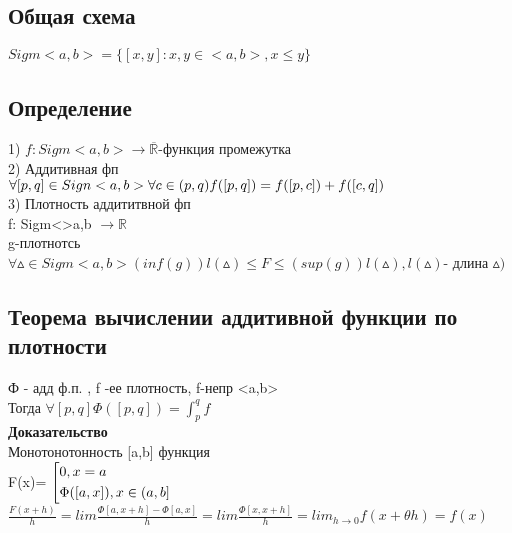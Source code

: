 \documentclass[12pt, a4paper]{article}
\begin{document}
    \subsection{Общая схема}
    
    $Sigm<a,b> = \lbrace[x,y]:x,y \in <a,b>,x \leq y \rbrace$ \\
    
     \subsection{Определение}
     1) $f: Sigm<a,b> \rightarrow \overline{{\mathbb{R}}}$-функция промежутка \\
     2) Аддитивная фп \\
      $\forall [p,q] \in Sign<a,b> \forall c \in(p,q) \\
     f([p,q])= f([p,c])+f([c,q])$\\
     3) Плотность аддититвной фп \\
     f: Sigm<>a,b $\rightarrow \mathbb{R}$\\
     g-плотнотсь $\forall \vartriangle \in Sigm <a,b> (inf (g))l(\vartriangle)\leq F\leq(sup (g) )l(\vartriangle) ,l(\vartriangle)$- длина $\vartriangle)$\\
     
     
     \subsection{Теорема вычислении аддитивной функции по  плотности} 
     Ф - адд ф.п. , f -ее плотность, f-непр <a,b>\\
     Тогда  $\forall [p,q] \Phi([p,q])=\int_{p}^{q} f$ \\
     
     \textbf{Доказательство} \\
     Монотонотонность [a,b] функция \\
     F(x)=
     $\left[
     \begin{gathered} 
        0,x=a\hfill 
         \\
        \Phi([a,x]),x \in (a,b]\hfill 
         \\
      \end{gathered} 
    \right.$ \\

$\frac{F(x+h)}{h} = lim\frac{\Phi[a,x+h]-\Phi[a,x]}{h}= lim \frac{\Phi[x,x+h]}{h}=lim_{h\rightarrow 0}f(x+\theta h )=f(x)$ \\
\end{document}
